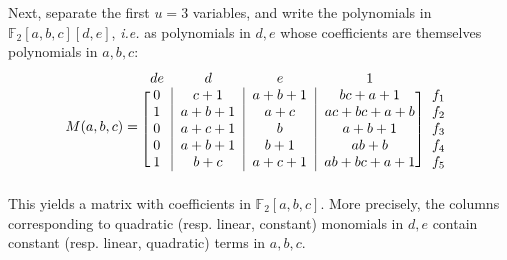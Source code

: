 \documentclass[a4paper]{article}
\begin{document}
Next, separate the first $u=3$ variables, and write the polynomials in
$\mathbb{F}_2[a,b,c][d,e]$, \textit{i.e.} as polynomials in $d, e$ whose coefficients are themselves polynomials in $a, b, c$:
\begin{equation}
  \label{eq:example_matrix}
  M(a,b,c) = \begin{blockarray}{ccccc}
  de & d & e & 1 & \\
  \begin{block}{[c|c|c|c]c}
  0 & c+1 & a+b+1 & bc + a + 1 & f_1\\
  1 & a+b+1 & a+c     & ac +bc + a+b & f_2\\
  0 & a+c+1 & b & a+b+1          & f_3 \\
  0 & a+b+1 & b+1 & ab+b  & f_4 \\
  1 & b+c & a+c+1 & ab+bc+a+1 & f_5 \\
\end{block}
\end{blockarray}
\end{equation}
This yields a matrix with coefficients in $\mathbb{F}_2[a,b,c]$. More precisely,
the columns corresponding to quadratic (resp. linear, constant) monomials in
$d,e$ contain constant (resp. linear, quadratic) terms in $a,b,c$. %
\end{document}
